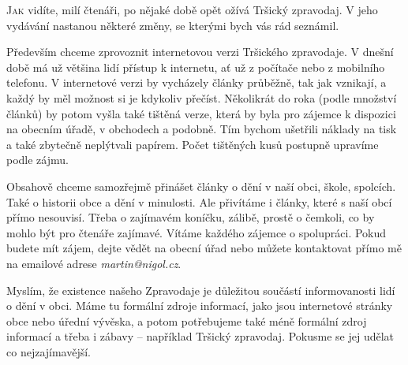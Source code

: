 \documentclass{article}
\begin{document}
\begin{multicols}{3}{


\lettrine{J}{ak} vidíte, milí čtenáři, po nějaké době opět ožívá Tršický zpravodaj. V jeho vydávání nastanou některé změny, se kterými bych vás rád seznámil.

Především chceme zprovoznit internetovou verzi Tršického zpravodaje. V dnešní době má už většina lidí přístup k internetu, ať už z počítače nebo z mobilního telefonu. V internetové verzi by vycházely články průběžně, tak jak vznikají, a každý by měl možnost si je kdykoliv přečíst. Několikrát do roka (podle množství článků) by potom vyšla také tištěná verze, která by byla pro zájemce k dispozici na obecním úřadě, v obchodech a podobně. Tím bychom ušetřili náklady na tisk a také zbytečně neplýtvali papírem. Počet tištěných kusů postupně upravíme podle zájmu.

Obsahově chceme samozřejmě přinášet články o dění v naší obci, škole, spolcích. Také o historii obce a dění v minulosti. Ale přivítáme i články, které s naší obcí přímo nesouvisí. Třeba o zajímavém koníčku, zálibě, prostě o čemkoli, co by mohlo být pro čtenáře zajímavé. Vítáme každého zájemce o spolupráci. Pokud budete mít zájem, dejte vědět na obecní úřad nebo můžete kontaktovat přímo mě na emailové adrese \emph{martin@nigol.cz}.

Myslím, že existence našeho Zpravodaje je důležitou součástí informovanosti lidí o dění v obci. Máme tu formální zdroje informací, jako jsou internetové stránky obce nebo úřední vývěska, a potom potřebujeme také méně formální zdroj informací a třeba i zábavy – například Tršický zpravodaj. Pokusme se jej udělat co nejzajímavější.

}\end{multicols}

\closearticle
\end{document}

